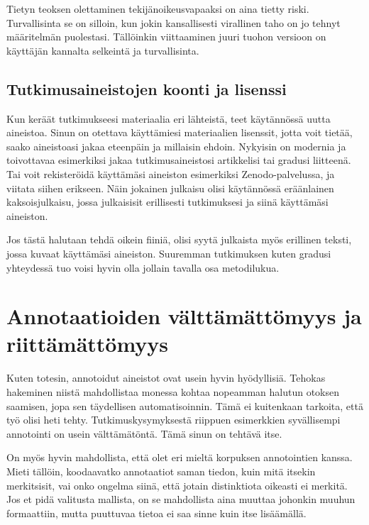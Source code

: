 \documentclass[]{book}
\begin{document}
Tietyn teoksen olettaminen tekijänoikeusvapaaksi on aina tietty riski.
Turvallisinta se on silloin, kun jokin kansallisesti virallinen taho on
jo tehnyt määritelmän puolestasi. Tällöinkin viittaaminen juuri tuohon
versioon on käyttäjän kannalta selkeintä ja turvallisinta.

\hypertarget{tutkimusaineistojen-koonti-ja-lisenssi}{%
\subsection{Tutkimusaineistojen koonti ja
lisenssi}\label{tutkimusaineistojen-koonti-ja-lisenssi}}

Kun keräät tutkimukseesi materiaalia eri lähteistä, teet käytännössä
uutta aineistoa. Sinun on otettava käyttämiesi materiaalien lisenssit,
jotta voit tietää, saako aineistoasi jakaa eteenpäin ja millaisin
ehdoin. Nykyisin on modernia ja toivottavaa esimerkiksi jakaa
tutkimusaineistosi artikkelisi tai gradusi liitteenä. Tai voit
rekisteröidä käyttämäsi aineiston esimerkiksi Zenodo-palvelussa, ja
viitata siihen erikseen. Näin jokainen julkaisu olisi käytännössä
eräänlainen kaksoisjulkaisu, jossa julkaisisit erillisesti tutkimuksesi
ja siinä käyttämäsi aineiston.

Jos tästä halutaan tehdä oikein fiiniä, olisi syytä julkaista myös
erillinen teksti, jossa kuvaat käyttämäsi aineiston. Suuremman
tutkimuksen kuten gradusi yhteydessä tuo voisi hyvin olla jollain
tavalla osa metodilukua.

\hypertarget{annotaatioiden-valttamattomyys-ja-riittamattomyys}{%
\section{Annotaatioiden välttämättömyys ja
riittämättömyys}\label{annotaatioiden-valttamattomyys-ja-riittamattomyys}}

Kuten totesin, annotoidut aineistot ovat usein hyvin hyödyllisiä.
Tehokas hakeminen niistä mahdollistaa monessa kohtaa nopeamman halutun
otoksen saamisen, jopa sen täydellisen automatisoinnin. Tämä ei
kuitenkaan tarkoita, että työ olisi heti tehty. Tutkimuskysymyksestä
riippuen esimerkkien syvällisempi annotointi on usein välttämätöntä.
Tämä sinun on tehtävä itse.

On myös hyvin mahdollista, että olet eri mieltä korpuksen annotointien
kanssa. Mieti tällöin, koodaavatko annotaatiot saman tiedon, kuin mitä
itsekin merkitsisit, vai onko ongelma siinä, että jotain distinktiota
oikeasti ei merkitä. Jos et pidä valitusta mallista, on se mahdollista
aina muuttaa johonkin muuhun formaattiin, mutta puuttuvaa tietoa ei saa
sinne kuin itse lisäämällä.
\end{document}
